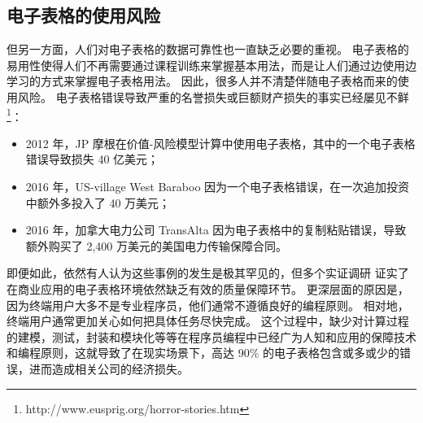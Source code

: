 
\subsection{电子表格的使用风险}

但另一方面，人们对电子表格的数据可靠性也一直缺乏必要的重视。
电子表格的易用性使得人们不再需要通过课程训练来掌握基本用法，而是让人们通过边使用边学习的方式来掌握电子表格用法。
因此，很多人并不清楚伴随电子表格而来的使用风险。
电子表格错误导致严重的名誉损失或巨额财产损失的事实已经屡见不鲜\footnote{http://www.eusprig.org/horror-stories.htm}：

\begin{itemize}
    \item 2012 年，JP 摩根在价值-风险模型计算中使用电子表格，其中的一个电子表格错误导致损失 40 亿美元；
    \item 2016 年，US-village West Baraboo 因为一个电子表格错误，在一次追加投资中额外多投入了 40 万美元；
    \item 2016 年，加拿大电力公司 TransAlta 因为电子表格中的复制粘贴错误，导致额外购买了 2,400 万美元的美国电力传输保障合同。
\end{itemize}
    
即便如此，依然有人认为这些事例的发生是极其罕见的，但多个实证调研 \cite{panko2016we,powell2009impact} 证实了在商业应用的电子表格环境依然缺乏有效的质量保障环节。
更深层面的原因是，因为终端用户大多不是专业程序员，他们通常不遵循良好的编程原则。
相对地，终端用户通常更加关心如何把具体任务尽快完成。
这个过程中，缺少对计算过程的建模，测试，封装和模块化等等在程序员编程中已经广为人知和应用的保障技术和编程原则，这就导致了在现实场景下，高达 90\% 的电子表格包含或多或少的错误\cite{rajalingham2008classification}，进而造成相关公司的经济损失。



